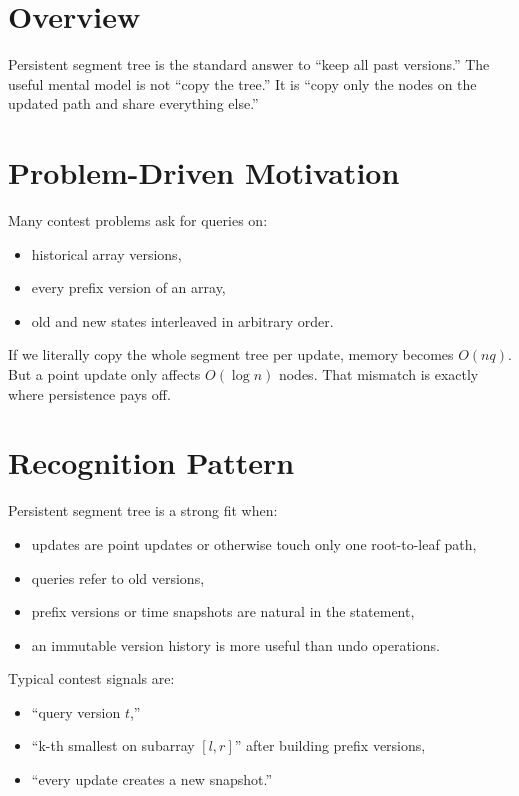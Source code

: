 \section*{Overview}

Persistent segment tree is the standard answer to ``keep all past versions.'' The useful mental model is not ``copy the
tree.'' It is ``copy only the nodes on the updated path and share everything else.''

\section*{Problem-Driven Motivation}

Many contest problems ask for queries on:

\begin{itemize}
  \item historical array versions,
  \item every prefix version of an array,
  \item old and new states interleaved in arbitrary order.
\end{itemize}

If we literally copy the whole segment tree per update, memory becomes \(O(nq)\). But a point update only affects
\(O(\log n)\) nodes. That mismatch is exactly where persistence pays off.

\section*{Recognition Pattern}

Persistent segment tree is a strong fit when:

\begin{itemize}
  \item updates are point updates or otherwise touch only one root-to-leaf path,
  \item queries refer to old versions,
  \item prefix versions or time snapshots are natural in the statement,
  \item an immutable version history is more useful than undo operations.
\end{itemize}

Typical contest signals are:

\begin{itemize}
  \item ``query version \(t\),''
  \item ``k-th smallest on subarray \([l,r]\)'' after building prefix versions,
  \item ``every update creates a new snapshot.''
\end{itemize}

